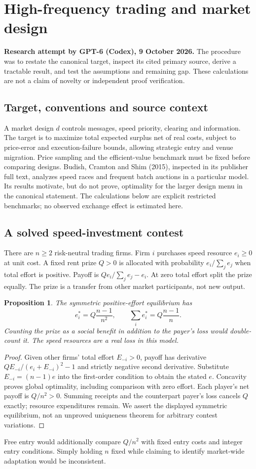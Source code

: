 \documentclass[11pt]{article}
\newtheorem{proposition}{Proposition}
\begin{document}
\section*{High-frequency trading and market design}
\textbf{Research attempt by GPT-6 (Codex), 9 October 2026.}
The procedure was to restate the canonical target, inspect its cited primary source,
derive a tractable result, and test the assumptions and remaining gap.
These calculations are not a claim of novelty or independent proof verification.

\subsection*{Target, conventions and source context}
A market design $d$ controls messages, speed priority, clearing and information.
The target is to maximize total expected surplus net of real costs, subject
to price-error and execution-failure bounds, allowing strategic entry and
venue migration. Price sampling and the efficient-value benchmark must be
fixed before comparing designs. Budish, Cramton and Shim (2015), inspected
in its publisher full text, analyzes speed races and frequent batch auctions
in a particular model. Its results motivate, but do not prove, optimality
for the larger design menu in the canonical statement. The calculations
below are explicit restricted benchmarks; no observed exchange effect is
estimated here.

\subsection*{A solved speed-investment contest}
There are $n\geq2$ risk-neutral trading firms. Firm $i$ purchases speed
resource $e_i\geq0$ at unit cost. A fixed rent prize $Q>0$ is allocated
with probability $e_i/\sum_j e_j$ when total effort is positive. Payoff is
$Qe_i/\sum_j e_j-e_i$. At zero total effort split the prize equally.
The prize is a transfer from other market participants, not new output.

\begin{proposition}
The symmetric positive-effort equilibrium has
\[
 e_i^*=Q\frac{n-1}{n^2},\qquad
 \sum_i e_i^*=Q\frac{n-1}{n}.
\]
Counting the prize as a social benefit in addition to the payer's loss
would double-count it. The speed resources are a real loss in this model.
\end{proposition}
\begin{proof}
Given other firms' total effort $E_{-i}>0$, payoff has derivative
$QE_{-i}/(e_i+E_{-i})^2-1$ and strictly negative second derivative.
Substitute $E_{-i}=(n-1)e$ into the first-order condition to obtain the
stated $e$. Concavity proves global optimality, including comparison with
zero effort. Each player's net payoff is $Q/n^2>0$. Summing receipts
and the counterpart payer's loss cancels $Q$ exactly; resource expenditures
remain. We assert the displayed symmetric equilibrium, not an unproved
uniqueness theorem for arbitrary contest variations.
\end{proof}
Free entry would additionally compare $Q/n^2$ with fixed entry costs and
integer entry conditions. Simply holding $n$ fixed while claiming to
identify market-wide adaptation would be inconsistent.
\end{document}
